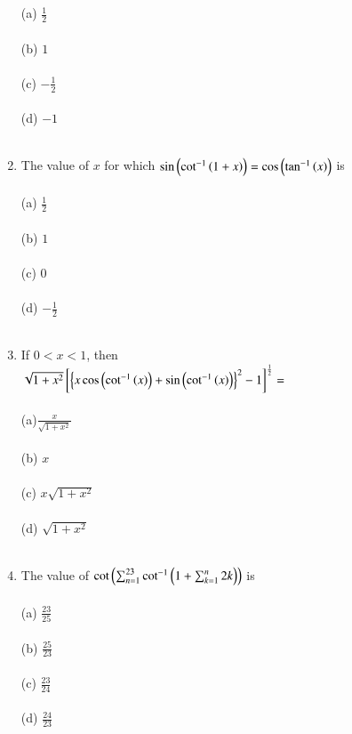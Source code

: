 \documentclass[journal,12pt,twocolumn]{IEEEtran}
\theoremstyle{remark}
\begin{document}
\begin{enumerate}
\hfill {}\\\\
(a) $\frac{1}{2}$\\\\ (b) $1$ \\\\(c) $-\frac{1}{2}$ \\\\(d) $-1$\\\\
\item The value of $x$ for which $\sin\left(\cot^{-1}\left(1+x\right)\right)=\cos \left(\tan ^{-1}\left(x\right)\right)$ is 
\hfill {}\\\\
(a) $\frac{1}{2}$ \\\\(b) $1$ \\\\(c) $0$ \\\\(d) $-\frac{1}{2}$\\\\
\item  If $0<x<1$, then \\
$\sqrt{1+x^2}\left[\left\{ x\cos \left(\cot ^{-1}\left(x\right)\right)+ \sin \left(\cot ^{-1}\left(x\right)\right)\right\}^2 -1\right]^{\frac{1}{2}}=$
\hfill {}\\\\
(a)$\frac{x}{\sqrt{1+x^2}}$ \\\\(b) $x$ \\\\(c) $x\sqrt{1+x^2}$ \\\\(d) $\sqrt{1+x^2}$\\\\
\item The value of $\cot \left(\sum_{n=1}^{23} \cot ^{-1}\left(1+\sum_{k=1}^{n} 2k\right)\right)$ is
\hfill {}\\\\
(a) $\frac{23}{25}$ \\\\(b) $\frac{25}{23}$ \\\\(c) $\frac{23}{24}$ \\\\(d) $\frac{24}{23}$ \\\\
\end{enumerate}
\end{document}
